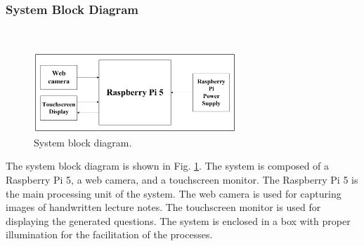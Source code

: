 \documentclass[conference]{IEEEtran}
\begin{document}
        \subsubsection{System Block Diagram}
            \hfill \\
            \vspace{-0.6cm}
            \begin{figure}[H]
                \centerline{\includegraphics[width=3in]{blockdiag.png}}
                \vspace{-0.3cm}
                \caption{System block diagram.} 
                \label{blockdiagram}
            \end{figure} 
            \vspace{-0.4cm}
            \indent The system block diagram is shown in Fig. 
            \ref{blockdiagram}. The system is composed of a 
            Raspberry Pi 5, a web camera, and a 
            touchscreen monitor. The Raspberry Pi 5 is the main 
            processing unit of the system. The web camera is 
            used for capturing images of handwritten lecture notes. 
            The touchscreen monitor is used for displaying the 
            generated questions. The system is enclosed in a box 
            with proper illumination for the facilitation of the 
            processes.
        \vspace{0.2cm}
\end{document}
